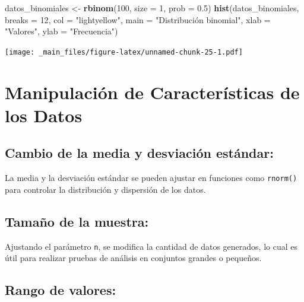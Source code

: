 \documentclass[
]{book}
\newenvironment{Shaded}{\begin{snugshade}}{\end{snugshade}}
\newcommand{\AttributeTok}[1]{\textcolor[rgb]{0.13,0.29,0.53}{#1}}
\newcommand{\DecValTok}[1]{\textcolor[rgb]{0.00,0.00,0.81}{#1}}
\newcommand{\FloatTok}[1]{\textcolor[rgb]{0.00,0.00,0.81}{#1}}
\newcommand{\FunctionTok}[1]{\textcolor[rgb]{0.13,0.29,0.53}{\textbf{#1}}}
\newcommand{\NormalTok}[1]{#1}
\newcommand{\OtherTok}[1]{\textcolor[rgb]{0.56,0.35,0.01}{#1}}
\newcommand{\StringTok}[1]{\textcolor[rgb]{0.31,0.60,0.02}{#1}}
\begin{document}
\begin{Shaded}
\begin{Highlighting}[]
\NormalTok{datos\_binomiales }\OtherTok{\textless{}{-}} \FunctionTok{rbinom}\NormalTok{(}\DecValTok{100}\NormalTok{, }\AttributeTok{size =} \DecValTok{1}\NormalTok{, }\AttributeTok{prob =} \FloatTok{0.5}\NormalTok{)}
\FunctionTok{hist}\NormalTok{(datos\_binomiales, }
     \AttributeTok{breaks =} \DecValTok{12}\NormalTok{,}
     \AttributeTok{col =} \StringTok{"lightyellow"}\NormalTok{, }
     \AttributeTok{main =} \StringTok{"Distribución binomial"}\NormalTok{, }
     \AttributeTok{xlab =} \StringTok{"Valores"}\NormalTok{,}
     \AttributeTok{ylab =} \StringTok{"Frecuencia"}\NormalTok{)}
\end{Highlighting}
\end{Shaded}

\texttt{[image: \_main\_files/figure-latex/unnamed-chunk-25-1.pdf]}

\hypertarget{manipulaciuxf3n-de-caracteruxedsticas-de-los-datos}{%
\section{Manipulación de Características de los Datos}\label{manipulaciuxf3n-de-caracteruxedsticas-de-los-datos}}

\hypertarget{cambio-de-la-media-y-desviaciuxf3n-estuxe1ndar}{%
\subsection{Cambio de la media y desviación estándar:}\label{cambio-de-la-media-y-desviaciuxf3n-estuxe1ndar}}

La media y la desviación estándar se pueden ajustar en funciones como \texttt{rnorm()} para controlar la distribución y dispersión de los datos.

\hypertarget{tamauxf1o-de-la-muestra}{%
\subsection{Tamaño de la muestra:}\label{tamauxf1o-de-la-muestra}}

Ajustando el parámetro \texttt{n}, se modifica la cantidad de datos generados, lo cual es útil para realizar pruebas de análisis en conjuntos grandes o pequeños.

\hypertarget{rango-de-valores}{%
\subsection{Rango de valores:}\label{rango-de-valores}}
\end{document}

